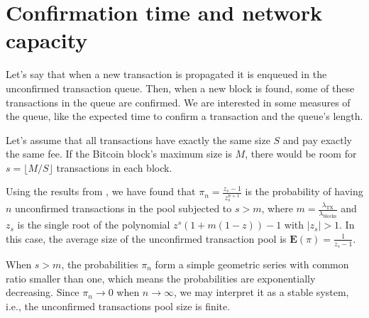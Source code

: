 



\section{Confirmation time and network capacity}

Let's say that when a new transaction is propagated it is enqueued in the unconfirmed transaction queue. Then, when a new block is found, some of these transactions in the queue are confirmed. We are interested in some measures of the queue, like the expected time to confirm a transaction and the queue's length.

Let's assume that all transactions have exactly the same size $S$ and pay exactly the same fee. If the Bitcoin block's maximum size is $M$, there would be room for $s = \lfloor M/S \rfloor$ transactions in each block.

Using the results from \citet{bailey1954queueing}, we have found that $\pi_n = \frac{z_s-1}{z_s^{n+1}}$ is the probability of having $n$ unconfirmed transactions in the pool subjected to $s > m$, where $m=\frac{\lambda_{\text{TX}}}{\lambda_{\text{blocks}}}$ and $z_s$ is the single root of the polynomial $z^s(1+m(1-z))-1$ with $|z_s|>1$. In this case, the average size of the unconfirmed transaction pool is $\mathbf{E}(\pi) = \frac{1}{z_s - 1}$.

When $s > m$, the probabilities $\pi_n$ form a simple geometric series with common ratio smaller than one, which means the probabilities are exponentially decreasing. Since $\pi_n \rightarrow 0$ when $n \rightarrow \infty$, we may interpret it as a stable system, i.e., the unconfirmed transactions pool size is finite.

